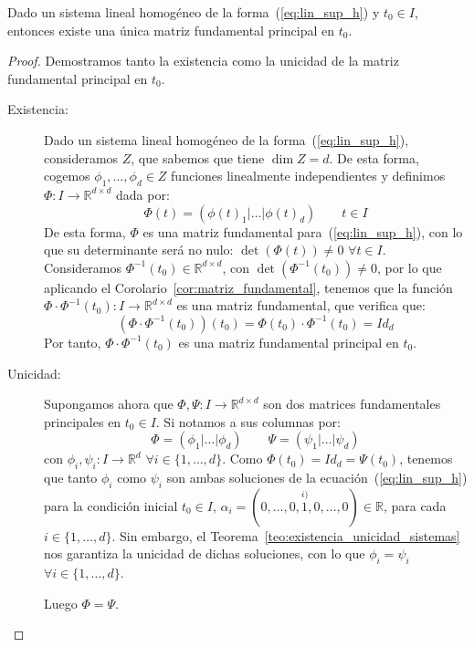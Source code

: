 \begin{prop}
    Dado un sistema lineal homogéneo de la forma~(\ref{eq:lin_sup_h}) y $t_0\in I$, entonces existe una única matriz fundamental principal en $t_0$.
    \begin{proof}
        Demostramos tanto la existencia como la unicidad de la matriz fundamental principal en $t_0$.
        \begin{description}
            \item[Existencia:] Dado un sistema lineal homogéneo de la forma~(\ref{eq:lin_sup_h}), consideramos $Z$, que sabemos que tiene $\dim Z = d$. De esta forma, cogemos $\phi_1,\ldots,\phi_d \in Z$ funciones linealmente independientes y definimos $\Phi:I\rightarrow\mathbb{R}^{d\times d}$ dada por:
            \begin{equation*}
                \Phi(t) = (\phi(t)_1|\ldots|\phi(t)_d)  \qquad t\in I
            \end{equation*}
            De esta forma, $\Phi$ es una matriz fundamental para~(\ref{eq:lin_sup_h}), con lo que su determinante será no nulo: $\det(\Phi(t)) \neq 0$ $\forall t\in I$. Consideramos $\Phi^{-1}(t_0) \in \mathbb{R}^{d\times d}$, con $\det(\Phi^{-1}(t_0)) \neq 0$, por lo que aplicando el Corolario~\ref{cor:matriz_fundamental}, tenemos que la función $\Phi\cdot \Phi^{-1}(t_0):I\rightarrow\mathbb{R}^{d\times d}$ es una matriz fundamental, que verifica que:
            \begin{equation*}
                (\Phi\cdot \Phi^{-1}(t_0))(t_0) = \Phi(t_0)\cdot \Phi^{-1}(t_0) = Id_d
            \end{equation*}
            Por tanto, $\Phi\cdot \Phi^{-1}(t_0)$ es una matriz fundamental principal en $t_0$.

            \item[Unicidad:] Supongamos ahora que $\Phi,\Psi:I\rightarrow\mathbb{R}^{d\times d}$ son dos matrices fundamentales principales en $t_0\in I$. Si notamos a sus columnas por:
            \begin{equation*}
                \Phi = (\phi_1|\ldots|\phi_d) \qquad \Psi = (\psi_1|\ldots|\psi_d)
            \end{equation*}
            con $\phi_i,\psi_i:I\rightarrow\mathbb{R}^d$ $\forall i \in \{1,\ldots,d\}$. Como $\Phi(t_0) = Id_d = \Psi(t_0)$, tenemos que tanto $\phi_i$ como $\psi_i$ son ambas soluciones de la ecuación~(\ref{eq:lin_sup_h}) para la condición inicial $t_0\in I$, $\alpha_i =(0,\ldots,0,\stackrel{i)}{1},0,\ldots,0)\in \mathbb{R}$, para cada $i \in \{1,\ldots,d\}$. Sin embargo, el Teorema~\ref{teo:existencia_unicidad_sistemas} nos garantiza la unicidad de dichas soluciones, con lo que $\phi_i = \psi_i$ $\forall i \in \{1,\ldots,d\}$.
    
            Luego $\Phi = \Psi$.
        \end{description}
    \end{proof}
\end{prop}

